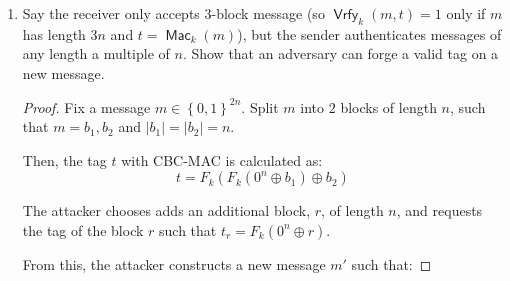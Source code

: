 \documentclass{article}
\DeclareMathOperator{\Mac}{\textsf{Mac}}
\DeclareMathOperator{\Vrfy}{\textsf{Vrfy}}
\begin{document}
\begin{enumerate}
\begin{enumerate}
\begin{proof}
          Using CBC-MAC, the sender calculates a tag $t$ for the message $m$:

          \[  
            t = F_k(F_k(0^n \oplus b_1) \oplus b_2)
          \]

          Then, the attacker creates a message $m'$ from the blocks of $m$ so
          that

          \[
            m' = b_1, b_2, t \oplus b_1, b_2
          \]

          With this, the tag for the message $m'$ is calculated as the
          following:


          \begin{align*}
            t' &= F_k(F_k(F_k(F_k(0^n \oplus b_1) \oplus b_2) \oplus (t \oplus
            b_1) \oplus b_2)\\
            &= F_k(F_k(t \oplus (t \oplus b_1) \oplus b_2)\\
            &= F_k(F_k(0 \oplus b_1) \oplus b_2)\\
            &= F_k(F_k(b_1) \oplus b_2)\\
            t' &= t
          \end{align*}

          Thus, we find a different message $m'$ that has the same tag $t$, and
          we have successfully forged a previously unknown tag.
        \end{proof}

      \item Say the receiver only accepts 3-block message (so $\Vrfy_k(m, t) =
        1$ only if $m$ has length $3n$ and $t = \Mac_k(m)$), but the sender
        authenticates messages of any length a multiple of $n$. Show that an
        adversary can forge a valid tag on a new message.

        \begin{proof}
          Fix a message $m \in \left\{0, 1\right\}^{2n}$. Split $m$ into $2$
          blocks of length $n$, such that $m = b_1, b_2$ and $|b_1| = |b_2| =
          n$.

          Then, the tag $t$ with CBC-MAC is calculated as:
          \[
            t = F_k(F_k(0^n \oplus b_1) \oplus b_2)
          \]

          The attacker chooses adds an additional block, $r$, of length $n$, and
          requests the tag of the block $r$ such that $t_r = F_k(0^n \oplus r)$.

          From this, the attacker constructs a new message $m'$ such that:


\end{proof}
\end{enumerate}
\end{enumerate}
\end{document}

